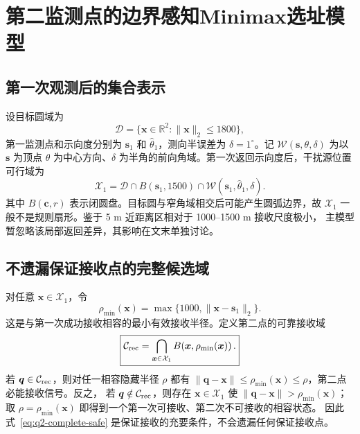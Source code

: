 
\section{第二监测点的边界感知Minimax选址模型}
\label{sec:q2-minimax}

\subsection{第一次观测后的集合表示}

设目标圆域为
\begin{equation}
 \mathcal D=\{\bm x\in\mathbb R^2:\|\bm x\|_2\le1800\},
\end{equation}
第一监测点和示向度分别为 $\bm s_1$ 和 $\hat\theta_1$，测向半误差为
$\delta=1^\circ$。记 $\mathcal W(\bm s,\theta,\delta)$ 为以 $\bm s$ 为顶点
$\theta$ 为中心方向、$\delta$ 为半角的前向角域。第一次返回示向度后，干扰源位置可行域为
\begin{equation}
 \mathcal X_1=\mathcal D\cap B(\bm s_1,1500)
 \cap\mathcal W(\bm s_1,\hat\theta_1,\delta).
 \label{eq:q2-first-set}
\end{equation}
其中 $B(\bm c,r)$ 表示闭圆盘。目标圆与窄角域相交后可能产生圆弧边界，故
$\mathcal X_1$ 一般不是规则扇形。鉴于 5 m 近距离区相对于 1000--1500 m 接收尺度极小，
主模型暂忽略该局部返回差异，其影响在文末单独讨论。

\subsection{不遗漏保证接收点的完整候选域}

对任意 $\bm x\in\mathcal X_1$，令
\begin{equation}
 \rho_{\min}(\bm x)=\max\{1000,\|\bm x-\bm s_1\|_2\}.
\end{equation}
这是与第一次成功接收相容的最小有效接收半径。定义第二点的可靠接收域
\begin{equation}
 \boxed{\mathcal C_{\rm rec}
 =\bigcap_{\bm x\in\mathcal X_1}
 B\!\left(\bm x,\rho_{\min}(\bm x)\right).}
 \label{eq:q2-complete-safe}
\end{equation}
若 $\bm q\in\mathcal C_{\rm rec}$，则对任一相容隐藏半径 $\rho$ 都有
$\|\bm q-\bm x\|\le\rho_{\min}(\bm x)\le\rho$，第二点必能接收信号。反之，
若 $\bm q\notin\mathcal C_{\rm rec}$，则存在 $\bm x\in\mathcal X_1$ 使
$\|\bm q-\bm x\|>\rho_{\min}(\bm x)$；取
$\rho=\rho_{\min}(\bm x)$ 即得到一个第一次可接收、第二次不可接收的相容状态。
因此式~\eqref{eq:q2-complete-safe} 是保证接收的充要条件，不会遗漏任何保证接收点。

